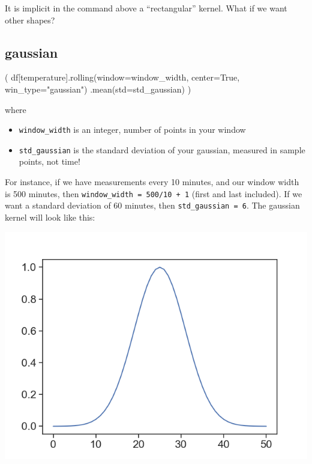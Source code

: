 \documentclass[
  letterpaper,
  DIV=11,
  numbers=noendperiod,
  oneside]{scrreprt}
\newenvironment{Shaded}{\begin{snugshade}}{\end{snugshade}}
\newcommand{\NormalTok}[1]{\textcolor[rgb]{0.00,0.23,0.31}{#1}}
\newcommand{\OperatorTok}[1]{\textcolor[rgb]{0.37,0.37,0.37}{#1}}
\newcommand{\StringTok}[1]{\textcolor[rgb]{0.13,0.47,0.30}{#1}}
\newcommand{\VariableTok}[1]{\textcolor[rgb]{0.07,0.07,0.07}{#1}}
\providecommand{\tightlist}{%
  \setlength{\itemsep}{0pt}\setlength{\parskip}{0pt}}\usepackage{longtable,booktabs,array}
\begin{document}
It is implicit in the command above a ``rectangular'' kernel. What if we
want other shapes?

\hypertarget{gaussian}{%
\subsection{gaussian}\label{gaussian}}

\begin{Shaded}
\begin{Highlighting}[]
\NormalTok{(}
\NormalTok{df[}\StringTok{\textquotesingle{}temperature\textquotesingle{}}\NormalTok{].rolling(window}\OperatorTok{=}\NormalTok{window\_width,}
\NormalTok{                          center}\OperatorTok{=}\VariableTok{True}\NormalTok{,}
\NormalTok{                          win\_type}\OperatorTok{=}\StringTok{"gaussian"}\NormalTok{)}
\NormalTok{                 .mean(std}\OperatorTok{=}\NormalTok{std\_gaussian)}
\NormalTok{)}
\end{Highlighting}
\end{Shaded}

where

\begin{itemize}
\tightlist
\item
  \texttt{window\_width} is an integer, number of points in your window
\item
  \texttt{std\_gaussian} is the standard deviation of your gaussian,
  measured in sample points, not time!
\end{itemize}

For instance, if we have measurements every 10 minutes, and our window
width is 500 minutes, then \texttt{window\_width\ =\ 500/10\ +\ 1}
(first and last included). If we want a standard deviation of 60
minutes, then \texttt{std\_gaussian\ =\ 6}. The gaussian kernel will
look like this:

\includegraphics{smoothing/gaussian_kernel.png}
\end{document}
